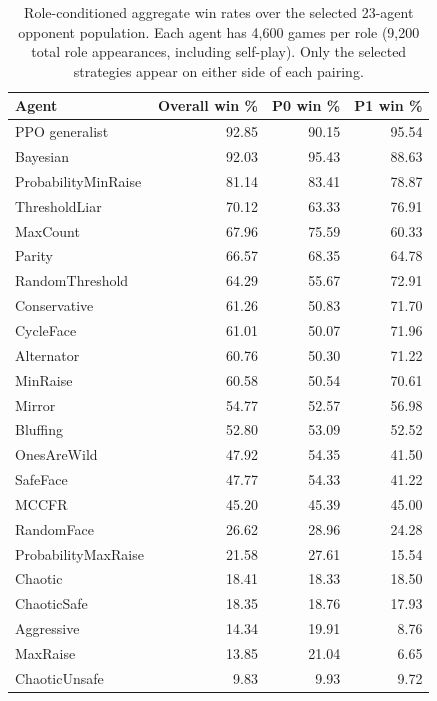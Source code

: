 \clearpage
\begin{table}[!ht]
\centering
\small
\begin{tabular}{lrrr}
\toprule
Agent & Overall win \% & P0 win \% & P1 win \% \\
\midrule
PPO generalist & 92.85 & 90.15 & 95.54 \\
Bayesian & 92.03 & 95.43 & 88.63 \\
ProbabilityMinRaise & 81.14 & 83.41 & 78.87 \\
ThresholdLiar & 70.12 & 63.33 & 76.91 \\
MaxCount & 67.96 & 75.59 & 60.33 \\
Parity & 66.57 & 68.35 & 64.78 \\
RandomThreshold & 64.29 & 55.67 & 72.91 \\
Conservative & 61.26 & 50.83 & 71.70 \\
CycleFace & 61.01 & 50.07 & 71.96 \\
Alternator & 60.76 & 50.30 & 71.22 \\
MinRaise & 60.58 & 50.54 & 70.61 \\
Mirror & 54.77 & 52.57 & 56.98 \\
Bluffing & 52.80 & 53.09 & 52.52 \\
OnesAreWild & 47.92 & 54.35 & 41.50 \\
SafeFace & 47.77 & 54.33 & 41.22 \\
MCCFR & 45.20 & 45.39 & 45.00 \\
RandomFace & 26.62 & 28.96 & 24.28 \\
ProbabilityMaxRaise & 21.58 & 27.61 & 15.54 \\
Chaotic & 18.41 & 18.33 & 18.50 \\
ChaoticSafe & 18.35 & 18.76 & 17.93 \\
Aggressive & 14.34 & 19.91 & 8.76 \\
MaxRaise & 13.85 & 21.04 & 6.65 \\
ChaoticUnsafe & 9.83 & 9.93 & 9.72 \\
\bottomrule
\end{tabular}
\caption{Role-conditioned aggregate win rates over the selected 23-agent opponent population. Each agent has 4,600 games per role (9,200 total role appearances, including self-play). Only the selected strategies appear on either side of each pairing.}
\end{table}
\clearpage
\clearpage

